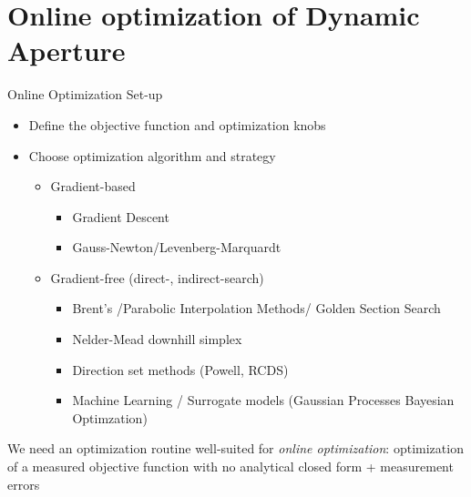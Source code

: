 \documentclass[aspectratio=169]{beamer}
\begin{document}
\section{Online optimization of Dynamic Aperture}
\begin{frame}{Online Optimization Set-up}
    \begin{itemize}
        \item Define the objective function and optimization knobs
    \end{itemize}{}
    \begin{itemize}
        \item Choose optimization algorithm and strategy
    \begin{itemize}
        \item Gradient-based
        \begin{itemize}
            \item Gradient Descent
            \item Gauss-Newton/Levenberg-Marquardt
        \end{itemize}
        \item Gradient-free (direct-, indirect-search)
        \begin{itemize}
            \item Brent's /Parabolic Interpolation Methods/ Golden Section Search
            \item Nelder-Mead downhill simplex
            \item Direction set methods (Powell, RCDS)
            \item Machine Learning / Surrogate models (Gaussian Processes Bayesian Optimzation)
        \end{itemize}
    \end{itemize}{}
    \end{itemize}{}
    \pause
    We need an optimization routine well-suited for \textit{online optimization}: optimization of a measured objective function with no analytical closed form + measurement errors
\end{frame}{}
\end{document}
